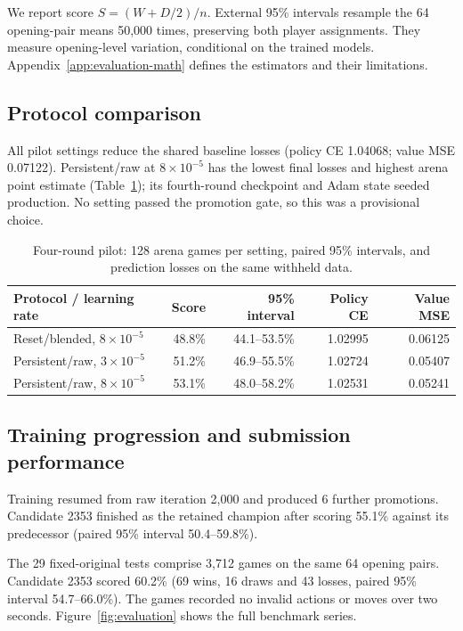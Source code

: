 \documentclass[letterpaper]{article}
\begin{document}
We report score $S=(W+D/2)/n$. External 95\% intervals resample the 64 opening-pair
means 50,000 times, preserving both player assignments. They measure opening-level
variation, conditional on the trained models. Appendix~\ref{app:evaluation-math}
defines the estimators and their limitations.

\clearpage
\subsection{Protocol comparison}
All pilot settings reduce the shared baseline losses (policy CE 1.04068; value
MSE 0.07122). Persistent/raw at $8\times10^{-5}$ has the lowest final losses and
highest arena point estimate (Table~\ref{tab:pilot}); its fourth-round checkpoint
and Adam state seeded production. No setting passed the promotion gate, so this
was a provisional choice.

\begin{table}[htbp]
\centering\small
\caption{Four-round pilot: 128 arena games per setting, paired 95\% intervals,
and prediction losses on the same withheld data.}
\label{tab:pilot}
\begin{tabular}{@{}lrrrr@{}}
\toprule
Protocol / learning rate & Score & 95\% interval & Policy CE & Value MSE\\
\midrule
Reset/blended, $8\times10^{-5}$ & 48.8\% & 44.1--53.5\% & 1.02995 & 0.06125\\
Persistent/raw, $3\times10^{-5}$ & 51.2\% & 46.9--55.5\% & 1.02724 & 0.05407\\
Persistent/raw, $8\times10^{-5}$ & 53.1\% & 48.0--58.2\% & 1.02531 & 0.05241\\
\bottomrule
\end{tabular}
\end{table}

\subsection{Training progression and submission performance}
Training resumed from raw iteration 2,000 and produced 6 further promotions. Candidate 2353 finished as the retained champion after scoring 55.1\% against its predecessor (paired 95\% interval 50.4--59.8\%).

The 29 fixed-original tests comprise 3,712 games on the same 64 opening pairs. Candidate 2353 scored 60.2\% (69 wins, 16 draws and 43 losses, paired 95\% interval 54.7--66.0\%). The games recorded no invalid actions or moves over two seconds. Figure~\ref{fig:evaluation} shows the full benchmark series.
\end{document}
